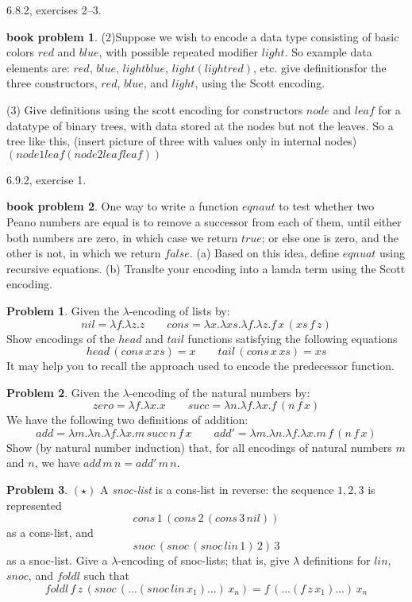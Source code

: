 \documentclass[10pt]{article}
\theoremstyle{definition}
\newtheorem{prob}{Problem}
\newtheorem{bp}{book problem}
\begin{document}
6.8.2, exercises 2--3.

\begin{bp}
  (2)Suppose we wish to encode a data type consisting of basic colors $red$ and $blue$, with possible repeated modifier $light$. So example data elements are: $red$, $blue$, $light blue$, $light(light red)$, etc. \newline
  give definitionsfor the three constructors, $red$, $blue$, and $light$, using the Scott encoding.

  (3) Give definitions using the scott encoding for constructors $node$ and $leaf$ for a datatype of binary trees, with data stored at the nodes but not the leaves. So a tree like this, (insert picture of three with values only in internal nodes) $(node 1 leaf(node 2 leaf leaf))$
\end{bp}

6.9.2, exercise 1.

\begin{bp}
 One way to write a function $eqnaut$ to test whether two Peano numbers are equal is to remove a successor from each of them, until either both numbers are zero, in which case we return $true$; or else one is zero, and the other is not, in which we return $false$.
 (a) Based on this idea, define $eqnuat$ using recursive equations.
 (b) Translte your encoding into a lamda term using the Scott encoding. 
\end{bp}

\begin{prob}
  Given the $\lambda$-encoding of lists by:
  \[
    nil = \lambda f. \lambda z. z \qquad cons = \lambda x. \lambda xs. \lambda f. \lambda z. f\,x\,(xs\,f\,z)
  \]
  Show encodings of the $head$ and $tail$ functions satisfying the following equations
  \[
    head\,(cons\,x\,xs) = x \qquad tail\,(cons\,x\,xs) = xs
  \]
  It may help you to recall the approach used to encode the predecessor function.
\end{prob}

\begin{prob}
  Given the $\lambda$-encoding of the natural numbers by:
  \[
    zero = \lambda f. \lambda x. x \qquad succ = \lambda n. \lambda f. \lambda x. f \, (n\,f\,x)
  \]
  We have the following two definitions of addition:
  \[
    add = \lambda m.\lambda n.\lambda f.\lambda x.m\,succ\,n\,f\,x \qquad add' = \lambda m.\lambda n.\lambda f.\lambda x. m\,f\,(n\,f\,x)
  \]
  Show (by natural number induction) that, for all encodings of natural numbers $m$ and $n$, we have $add\,m\,n = add'\,m\,n$.
\end{prob}

\begin{prob}
  $(\star)$ A \emph{snoc-list} is a cons-list in reverse: the sequence $1, 2, 3$ is represented
  \[
    cons\,1\,(cons\,2\,(cons\,3\,nil))
  \]
  as a cons-list, and
  \[
    snoc\,(snoc\,(snoc\,lin\,1)\,2)\,3
  \]
  as a snoc-list.  Give a $\lambda$-encoding of snoc-lists; that is, give $\lambda$ definitions for $lin$, $snoc$, and $foldl$ such that
  \[
    foldl\,f\,z\,(snoc\,(\dots(snoc\,lin\,x_1)\dots)\,x_n) = f\,(\dots(f\,z\,x_1)\dots)\,x_n
  \]
\end{prob}
\end{document}
